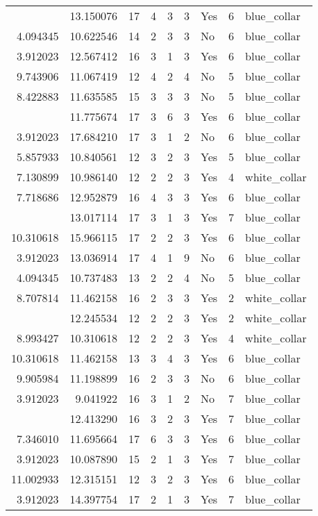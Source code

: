 \documentclass[
]{article}
\begin{document}
\begin{longtable}[t]{rrrrrllrl}
\addlinespace
10.820778 & 13.150076 & 17 & 4 & 3 & 3 & Yes & 6 & blue\_collar\\
4.094345 & 10.622546 & 14 & 2 & 3 & 3 & No & 6 & blue\_collar\\
3.912023 & 12.567412 & 16 & 3 & 1 & 3 & Yes & 6 & blue\_collar\\
9.743906 & 11.067419 & 12 & 4 & 2 & 4 & No & 5 & blue\_collar\\
8.422883 & 11.635585 & 15 & 3 & 3 & 3 & No & 5 & blue\_collar\\
\addlinespace
7.047517 & 11.775674 & 17 & 3 & 6 & 3 & Yes & 6 & blue\_collar\\
3.912023 & 17.684210 & 17 & 3 & 1 & 2 & No & 6 & blue\_collar\\
5.857933 & 10.840561 & 12 & 3 & 2 & 3 & Yes & 5 & blue\_collar\\
7.130899 & 10.986140 & 12 & 2 & 2 & 3 & Yes & 4 & white\_collar\\
7.718686 & 12.952879 & 16 & 4 & 3 & 3 & Yes & 6 & blue\_collar\\
\addlinespace
3.912023 & 13.017114 & 17 & 3 & 1 & 3 & Yes & 7 & blue\_collar\\
10.310618 & 15.966115 & 17 & 2 & 2 & 3 & Yes & 6 & blue\_collar\\
3.912023 & 13.036914 & 17 & 4 & 1 & 9 & No & 6 & blue\_collar\\
4.094345 & 10.737483 & 13 & 2 & 2 & 4 & No & 5 & blue\_collar\\
8.707814 & 11.462158 & 16 & 2 & 3 & 3 & Yes & 2 & white\_collar\\
\addlinespace
7.346010 & 12.245534 & 12 & 2 & 2 & 3 & Yes & 2 & white\_collar\\
8.993427 & 10.310618 & 12 & 2 & 2 & 3 & Yes & 4 & white\_collar\\
10.310618 & 11.462158 & 13 & 3 & 4 & 3 & Yes & 6 & blue\_collar\\
9.905984 & 11.198899 & 16 & 2 & 3 & 3 & No & 6 & blue\_collar\\
3.912023 & 9.041922 & 16 & 3 & 1 & 2 & No & 7 & blue\_collar\\
\addlinespace
5.521461 & 12.413290 & 16 & 3 & 2 & 3 & Yes & 7 & blue\_collar\\
7.346010 & 11.695664 & 17 & 6 & 3 & 3 & Yes & 6 & blue\_collar\\
3.912023 & 10.087890 & 15 & 2 & 1 & 3 & Yes & 7 & blue\_collar\\
11.002933 & 12.315151 & 12 & 3 & 2 & 3 & Yes & 6 & blue\_collar\\
3.912023 & 14.397754 & 17 & 2 & 1 & 3 & Yes & 7 & blue\_collar\\

\end{longtable}
\end{document}
